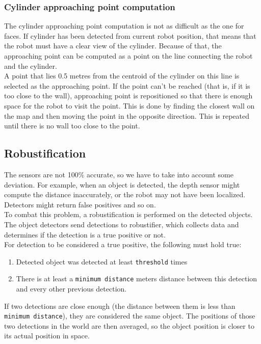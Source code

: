 \documentclass[12pt,a4paper]{article}
\begin{document}
	\subsubsection{Cylinder approaching point computation}
	The cylinder approaching point computation is not as difficult as the one for faces. If cylinder has been detected from current robot position, that means that the robot must have a clear view of the cylinder. Because of that, the approaching point can be computed as a point on the line connecting the robot and the cylinder. \\
	
	A point that lies 0.5 metres from the centroid of the cylinder on this line is selected as the approaching point. If the point can't be reached (that is, if it is too close to the wall), approaching point is repositioned so that there is enough space for the robot to visit the point. This is done by finding the closest wall on the map and then moving the point in the opposite direction. This is repeated until there is no wall too close to the point. \\
	
	\subsection{Robustification} \label{robustification}
	The sensors are not 100\% accurate, so we have to take into account some deviation. For example, when an object is detected, the depth sensor might compute the distance inaccurately, or the robot may not have been localized. Detectors might return false positives and so on. \\
	
	To combat this problem, a robustification is performed on the detected objects. The object detectors send detections to robustifier, which collects data and determines if the detection is a true positive or not. \\
	
	For detection to be considered a true positive, the following must hold true:
	\begin{enumerate}
		\item Detected object was detected at least \texttt{threshold} times
		\item There is at least a \texttt{minimum distance} meters distance between this detection and every other previous detection.
	\end{enumerate}

	If two detections are close enough (the distance between them is less than \texttt{minimum distance}), they are considered the same object. The positions of those two detections in the world are then averaged, so the object position is closer to its actual position in space.
	
\end{document}
